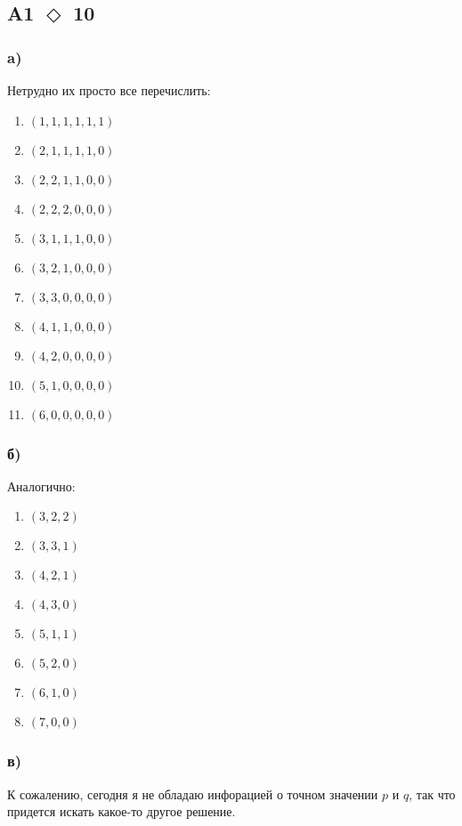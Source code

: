 \documentclass[a4paper]{article}
\begin{document}
  \subsection*{A1 $\Diamond$ 10}
  \subsubsection*{a)}
  Нетрудно их просто все перечислить:

  \begin{multicols}{2}
  \begin{enumerate}
      \item $(1, 1, 1, 1, 1, 1)$
      \item $(2, 1, 1, 1, 1, 0)$
      \item $(2, 2, 1, 1, 0, 0)$
      \item $(2, 2, 2, 0, 0, 0)$
      \item $(3, 1, 1, 1, 0, 0)$
      \item $(3, 2, 1, 0, 0, 0)$
      \item $(3, 3, 0, 0, 0, 0)$
      \item $(4, 1, 1, 0, 0, 0)$
      \item $(4, 2, 0, 0, 0, 0)$
      \item $(5, 1, 0, 0, 0, 0)$
      \item $(6, 0, 0, 0, 0, 0)$
  \end{enumerate}
  \end{multicols}

  \subsubsection*{б)}
  Аналогично:

  \begin{multicols}{2}
  \begin{enumerate}
      \item $(3, 2, 2)$
      \item $(3, 3, 1)$
      \item $(4, 2, 1)$
      \item $(4, 3, 0)$
      \item $(5, 1, 1)$
      \item $(5, 2, 0)$
      \item $(6, 1, 0)$
      \item $(7, 0, 0)$
  \end{enumerate}
  \end{multicols}


  \subsubsection*{в)}
  К сожалению, сегодня я не обладаю инфорацией о точном значении $p$ и $q$, так что придется искать какое-то другое решение.
\end{document}
